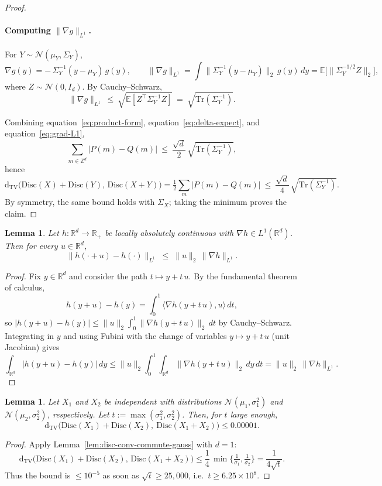 \documentclass[10pt]{article} %
\def\eqref#1{equation~\ref{#1}}
\theoremstyle{plain}
\newtheorem{lemma}[theorem]{Lemma}
\newcommand{\dtv}{\mathrm{d_{TV}}}
\newcommand{\disc}{\mathrm{Disc}}
\begin{document}
\begin{proof}
\paragraph{Computing $\|\nabla g\|_{L^1}$.}
For $Y\sim\mathcal{N}(\mu_Y,\Sigma_Y)$,
\[
\nabla g(y)=-\,\Sigma_Y^{-1}(y-\mu_Y)\,g(y),
\qquad
\|\nabla g\|_{L^1}=\int \|\Sigma_Y^{-1}(y-\mu_Y)\|_2\,g(y)\,dy
=\mathbb{E}\big[\|\Sigma_Y^{-1/2}Z\|_2\big],
\]
where $Z\sim\mathcal{N}(0,I_d)$. By Cauchy--Schwarz,
\begin{equation}\label{eq:grad-L1}
\|\nabla g\|_{L^1}\ \le\ \sqrt{\mathbb{E}\!\left[Z^\top \Sigma_Y^{-1} Z\right]}\ =\ \sqrt{\mathrm{Tr}(\Sigma_Y^{-1})}.
\end{equation}

Combining \eqref{eq:product-form}, \eqref{eq:delta-expect}, and \eqref{eq:grad-L1},
\[
\sum_{m\in\mathbb{Z}^d}\!|P(m)-Q(m)|\ \le\ \frac{\sqrt{d}}{2}\,\sqrt{\mathrm{Tr}(\Sigma_Y^{-1})},
\]
hence
\[
\dtv\!\big(\disc(X)+\disc(Y),\,\disc(X+Y)\big)
=\tfrac12\sum_{m}|P(m)-Q(m)|
\ \le\ \frac{\sqrt{d}}{4}\,\sqrt{\mathrm{Tr}(\Sigma_Y^{-1})}.
\]
By symmetry, the same bound holds with $\Sigma_X$; taking the minimum proves the claim.
\end{proof}


\begin{lemma}
\label{lem:shift-L1}
Let $h:\mathbb{R}^d\to\mathbb{R}_+$ be locally absolutely continuous with $\nabla h\in L^1(\mathbb{R}^d)$.
Then for every $u\in\mathbb{R}^d$,
\[
\|h(\cdot+u)-h(\cdot)\|_{L^1}\;\le\;\|u\|_2\,\|\nabla h\|_{L^1}.
\]
\end{lemma}
\begin{proof}
Fix $y\in\mathbb{R}^d$ and consider the path $t\mapsto y+t\,u$. By the fundamental theorem of calculus,
\[
h(y+u)-h(y)=\int_0^1 \langle\nabla h(y+t\,u),u\rangle\,dt,
\]
so $|h(y+u)-h(y)|\le \|u\|_2\int_0^1 \|\nabla h(y+t\,u)\|_2\,dt$ by Cauchy--Schwarz.
Integrating in $y$ and using Fubini with the change of variables $y\mapsto y+t\,u$ (unit Jacobian) gives
\[
\int_{\mathbb{R}^d}\!|h(y+u)-h(y)|\,dy
\le \|u\|_2\int_0^1\int_{\mathbb{R}^d}\!\|\nabla h(y+t\,u)\|_2\,dy\,dt
=\|u\|_2\,\|\nabla h\|_{L^1}.
\]
\end{proof}

\begin{lemma}
\label{lem:conv-disc-close-to-disc-conv}
Let $X_1$ and $X_2$ be independent with distributions
$\mathcal{N}(\mu_1,\sigma_1^2)$ and $\mathcal{N}(\mu_2,\sigma_2^2)$, respectively.
Let $t:=\max(\sigma_1^2,\sigma_2^2)$. Then, for $t$ large enough,
\[
\dtv\!\big(\disc(X_1)+\disc(X_2),\ \disc(X_1+X_2)\big) \le 0.00001.
\]
\end{lemma}
\begin{proof}
Apply Lemma~\ref{lem:disc-conv-commute-gauss} with $d=1$:
\[
\dtv\!\big(\disc(X_1)+\disc(X_2),\,\disc(X_1+X_2)\big)
\le \frac{1}{4}\,\min\!\Big\{\tfrac{1}{\sigma_1},\tfrac{1}{\sigma_2}\Big\}
= \frac{1}{4\sqrt{t}}.
\]
Thus the bound is $\le 10^{-5}$ as soon as $\sqrt{t}\ge 25{,}000$, i.e.\ $t\ge 6.25\times10^{8}$.
\end{proof}
\end{document}
